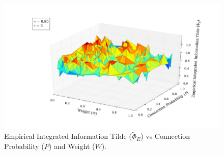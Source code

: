 \documentclass[a4paper,11pt]{article}
\begin{document}
\begin{figure}[H]
\begin{minipage}[b]{0.5\linewidth}
\begin{center}
		\end{center}
		\vspace{4ex}
	\end{minipage}
	\begin{minipage}[b]{0.5\linewidth}
		\begin{center}
		\includegraphics[scale = 0.2]{figures/snn/p_w_phi_tilde_95_5}
		\end{center}
		\vspace{4ex}
	\end{minipage}
	\caption{
		Empirical Integrated Information Tilde ($\widetilde{\Phi}_E$) vs Connection Probability ($P$) and Weight ($W$).
		\label{fig:p_w_phi_tilde_all}
	}
\end{figure}
\end{document}
